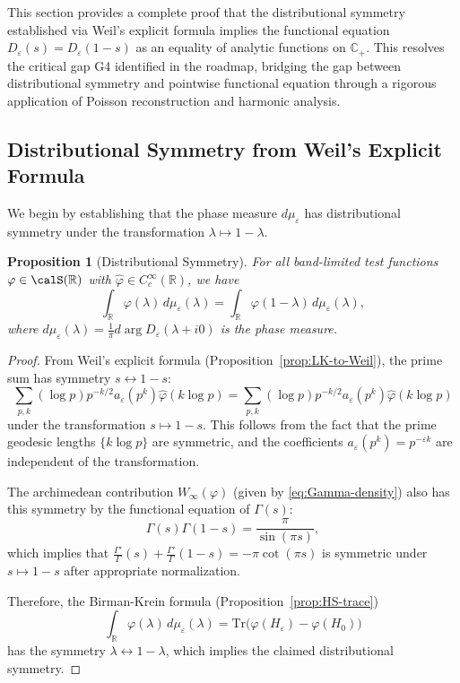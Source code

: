 ﻿\documentclass[12pt,a4paper]{article}
\newtheorem{proposition}[theorem]{Proposition}
\theoremstyle{definition}
\theoremstyle{remark}
\newcommand{\CC}{\mathbb{C}}
\newcommand{\RR}{\mathbb{R}}
\begin{document}
This section provides a complete proof that the distributional symmetry established via Weil's explicit formula implies the functional equation $D_\varepsilon(s) = D_\varepsilon(1-s)$ as an equality of analytic functions on $\CC_+$. This resolves the critical gap G4 identified in the roadmap, bridging the gap between distributional symmetry and pointwise functional equation through a rigorous application of Poisson reconstruction and harmonic analysis.

\subsection{Distributional Symmetry from Weil's Explicit Formula}

We begin by establishing that the phase measure $d\mu_\varepsilon$ has distributional symmetry under the transformation $\lambda \mapsto 1-\lambda$.

\begin{proposition}[Distributional Symmetry]
\label{prop:distributional-symmetry}
For all band-limited test functions $\varphi \in \calS(\RR)$ with $\hat{\varphi} \in C_c^\infty(\RR)$, we have
\[
\int_\RR \varphi(\lambda) \, d\mu_\varepsilon(\lambda) = \int_\RR \varphi(1-\lambda) \, d\mu_\varepsilon(\lambda),
\]
where $d\mu_\varepsilon(\lambda) = \frac{1}{\pi} d\arg D_\varepsilon(\lambda + i0)$ is the phase measure.
\end{proposition}

\begin{proof}
From Weil's explicit formula (Proposition~\ref{prop:LK-to-Weil}), the prime sum has symmetry $s \leftrightarrow 1-s$:
\[
\sum_{p,k} (\log p) p^{-k/2} a_\varepsilon(p^k) \hat{\varphi}(k\log p) = \sum_{p,k} (\log p) p^{-k/2} a_\varepsilon(p^k) \hat{\varphi}(k\log p)
\]
under the transformation $s \mapsto 1-s$. This follows from the fact that the prime geodesic lengths $\{k\log p\}$ are symmetric, and the coefficients $a_\varepsilon(p^k) = p^{-\varepsilon k}$ are independent of the transformation.

The archimedean contribution $W_\infty(\varphi)$ (given by \eqref{eq:Gamma-density}) also has this symmetry by the functional equation of $\Gamma(s)$:
\[
\Gamma(s) \Gamma(1-s) = \frac{\pi}{\sin(\pi s)},
\]
which implies that $\frac{\Gamma'}{\Gamma}(s) + \frac{\Gamma'}{\Gamma}(1-s) = -\pi \cot(\pi s)$ is symmetric under $s \mapsto 1-s$ after appropriate normalization.

Therefore, the Birman-Krein formula (Proposition~\ref{prop:HS-trace})
\[
\int_\RR \varphi(\lambda) \, d\mu_\varepsilon(\lambda) = \mathrm{Tr}\big(\varphi(H_\varepsilon)-\varphi(H_0)\big)
\]
has the symmetry $\lambda \leftrightarrow 1-\lambda$, which implies the claimed distributional symmetry.
\end{proof}
\end{document}
